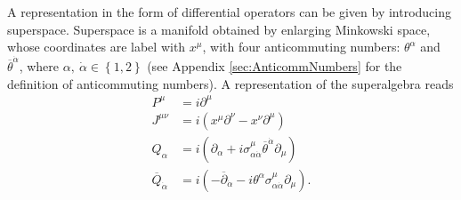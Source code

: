 A representation in the form of differential operators can be given by introducing superspace. Superspace is a manifold obtained by enlarging Minkowski space, whose coordinates are label with $x^\mu$, with four anticommuting numbers: $\theta^\alpha$ and $\overline{\theta}^{\dot{\alpha}}$, where $\alpha,\ \dot{\alpha} \in \left\{ 1,2 \right\}$ (see Appendix \ref{sec:AnticommNumbers} for the definition of anticommuting numbers). A representation of the superalgebra reads
\begin{align}
P^\mu &= i\partial^\mu\nonumber\\
J^{\mu\nu} &= i(x^\mu\partial^\nu - x^\nu\partial^\mu)\nonumber\\
Q_\alpha &= i(\partial_\alpha + i\sigma^\mu_{\alpha\dot{\alpha}}
\overline{\theta}^{\dot{\alpha}}\partial_\mu)\nonumber\\
\overline{Q}_{\dot{\alpha}} &= i(-\overline{\partial}_{\dot{\alpha}} - i \theta^\alpha \sigma^\mu_{\alpha\dot{\alpha}}\partial_\mu).\label{eq:SUSYGen}
\end{align}



